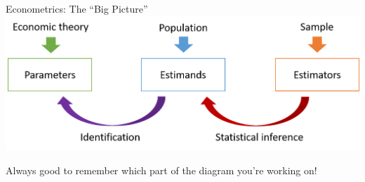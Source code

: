 \documentclass[11pt, english]{beamer}
\begin{document}
	\begin{frame}{Econometrics: The ``Big Picture''}
		\includegraphics[width=1\textwidth]{figures/BigPicture.png}
		\medskip

		\begin{center}
			Always good to remember which part of the diagram you're working on!
		\end{center}
	\end{frame}
\end{document}

